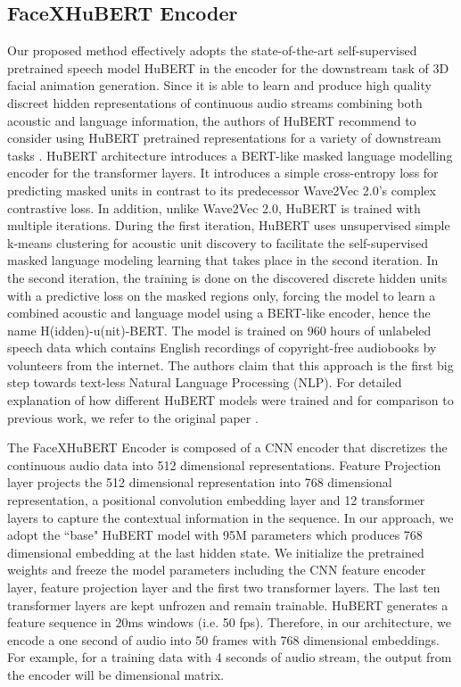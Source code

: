 \documentclass[10pt,twocolumn,letterpaper]{article}
\begin{document}
\subsection{FaceXHuBERT Encoder}
\label{sec:enc}
Our proposed method effectively adopts the state-of-the-art self-supervised pretrained speech model HuBERT in the encoder for the downstream task of 3D facial animation generation. Since it is able to learn and produce high quality discreet hidden representations of continuous audio streams combining both acoustic and language information, the authors of HuBERT recommend to consider using HuBERT pretrained representations for a variety of downstream tasks \cite{HuBERT}. HuBERT architecture introduces a BERT-like \cite{BERT} masked language modelling encoder for the transformer layers. It introduces a simple cross-entropy loss for predicting masked units in contrast to its predecessor Wave2Vec 2.0's \cite{Wav2Vec2} complex contrastive loss. In addition, unlike Wave2Vec 2.0, HuBERT is trained with multiple iterations. During the first iteration, HuBERT uses unsupervised simple k-means clustering for acoustic unit discovery to facilitate the self-supervised masked language modeling learning that takes place in the second iteration. In the second iteration, the training is done on the discovered discrete hidden units with a predictive loss on the masked regions only, forcing the model to learn a combined acoustic and language model using a BERT-like encoder, hence the name H(idden)-u(nit)-BERT. The model is trained on 960 hours of unlabeled speech data \cite{librispeech}  which contains English recordings of copyright-free audiobooks by volunteers from the internet. The authors claim that this approach is the first big step towards text-less Natural Language Processing (NLP). For detailed explanation of how different HuBERT models were trained and for comparison to previous work, we refer to the original paper \cite{HuBERT}. 

The FaceXHuBERT Encoder is composed of a CNN encoder that discretizes the continuous audio data into 512 dimensional representations. Feature Projection layer projects the 512 dimensional representation into 768 dimensional representation, a positional convolution embedding layer and 12 transformer layers to capture the contextual information in the sequence. In our approach, we adopt the ``base" HuBERT model with 95M parameters which produces 768 dimensional embedding at the last hidden state. We initialize the pretrained weights and freeze the model parameters including the CNN feature encoder layer, feature projection layer and the first two transformer layers. The last ten transformer layers are kept unfrozen and remain trainable. HuBERT generates a feature sequence in 20ms windows (i.e. 50 fps). Therefore, in our architecture, we encode a one second of audio into 50 frames with 768 dimensional embeddings. For example, for a training data with 4 seconds of audio stream, the output from the encoder will be  dimensional matrix. 
\vspace{-1em}
\end{document}
